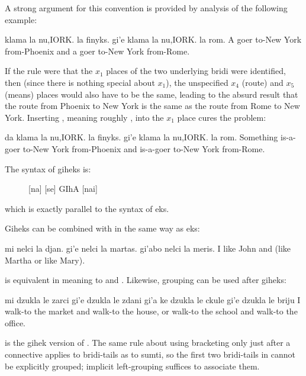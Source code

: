 A strong argument for this convention is provided by
    analysis of the following example:
\begin{example}
\T	klama la nu,IORK. la finyks.\n
\T	gi'e klama la nu,IORK. la rom.\n
A goer to-New York from-Phoenix\n
\T	and a goer to-New York from-Rome.
\end{example}

If the rule were that the $x_1$ places of the two underlying
    bridi were identified, then (since there is nothing special
    about $x_1$), the unspecified $x_4$ (route) and $x_5$ (means) places
    would also have to be the same, leading to the absurd result
    that the route from Phoenix to New York is the same as the
    route from Rome to New York. Inserting , meaning roughly
    , into the $x_1$ place cures the problem:
\begin{example}
da klama la nu,IORK. la finyks.\n
\T	gi'e klama la nu,IORK. la rom.\n
Something is-a-goer to-New York from-Phoenix\n
\T	and is-a-goer to-New York from-Rome.
\end{example}

The syntax of giheks is: 
\begin{description}
\item[] [na] [se] GIhA [nai]
\end{description}

which is exactly parallel to the syntax of eks.



Giheks can be combined with  in the same way as
    eks:
\begin{example}
mi nelci la djan.\n
\T	gi'e nelci la martas. gi'abo nelci la meris.\n
I like John\n
\T	and (like Martha or like Mary).
\end{example}

{\noindent}is equivalent in meaning to  and . Likewise,  grouping can be used after
    giheks:
\begin{example}
mi dzukla le zarci gi'e dzukla le zdani\n
\T	gi'a ke dzukla le ckule gi'e dzukla le briju \n
I walk-to the market and walk-to the house,\n
\T	or walk-to the school and walk-to the office.
\end{example}

{\noindent}is the gihek version of . The
    same rule about using  bracketing only just
    after a connective applies to bridi-tails as to sumti, so the
    first two bridi-tails in 
    cannot be explicitly grouped; implicit left-grouping suffices
    to associate them. 

